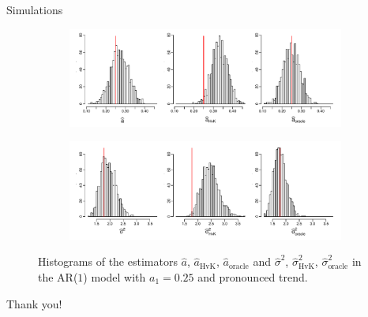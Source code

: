\documentclass[10pt, handout]{beamer}
\begin{document}
\begin{frame}{Simulations}


\begin{figure}[t!]
\centering
\begin{subfigure}[b]{0.8\textwidth}
\includegraphics[width=\textwidth]{a_hat_histograms_a1=25_T=500_slope=10_(q,r,M1,M2)=(25,10,20,30).pdf}
\end{subfigure}
\begin{subfigure}[b]{0.8\textwidth}
\includegraphics[width=\textwidth]{lrv_histograms_a1=25_T=500_slope=10_(q,r,M1,M2)=(25,10,20,30).pdf}
\end{subfigure}
\caption{Histograms of the estimators $\widehat{a}$, $\widehat{a}_{\text{HvK}}$, $\widehat{a}_{\text{oracle}}$ and $\widehat{\sigma}^2$, $\widehat{\sigma}^2_{\text{HvK}}$, $\widehat{\sigma}^2_{\text{oracle}}$ in the AR($1$) model with $a_1 = 0.25$ and pronounced trend.}\label{fig:hist_scenario2} 
\end{figure}

\end{frame}




\begin{frame}[standout]
  Thank you!
\end{frame}




\appendix
\end{document}
